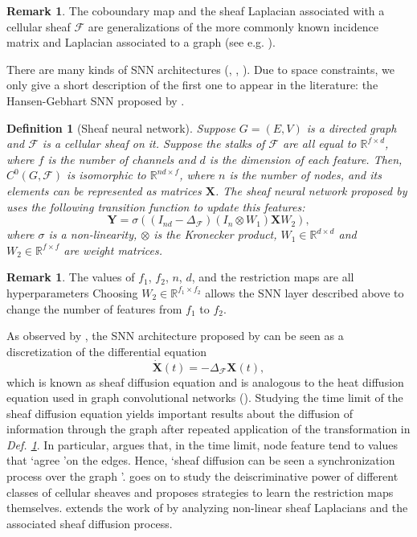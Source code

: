 \documentclass[11pt,a4paper,openright,twoside]{report}
\newcounter{mycounter}
\theoremstyle{plain}
\newtheorem{definition}[mycounter]{Definition}
\theoremstyle{definition}
\newtheorem{remark}[mycounter]{Remark}
\begin{document}
\begin{remark}
  The coboundary map and the sheaf Laplacian associated with a cellular sheaf $\mathcal{F}$ are generalizations of the more commonly known incidence matrix and Laplacian associated to a graph (see e.g. \cite{ward2022practical}).
\end{remark}

There are many kinds of SNN architectures (\cite{hansen2020sheaf}, \cite{bodnar2022neural}, \cite{zaghen2024nonlinear}). Due to space constraints, we only give a short description of the first one to appear in the literature: the Hansen-Gebhart SNN proposed by \cite{hansen2020sheaf}.

\begin{definition}[Sheaf neural network]
  \label{def: sheafnn}
  Suppose $G = (E,V)$ is a directed graph and $\mathcal{F}$ is a cellular sheaf on it. Suppose the stalks of $\mathcal{F}$ are all equal to $\mathbb{R}^{f \times d}$, where $f$ is the number of channels and $d$ is the dimension of each feature. Then, $C^0(G, \mathcal{F})$ is isomorphic to $\mathbb{R}^{nd \times f}$, where $n$ is the number of nodes, and its elements can be represented as matrices $\mathbf{X}$. The sheaf neural network proposed by \cite{hansen2020sheaf} uses the following transition function to update this features:
  \[\mathbf{Y} = \sigma((I_{nd} - \Delta_{\mathcal{F}})(I_{n} \otimes W_1)\mathbf{X}W_2),\]
  where $\sigma$ is a non-linearity, $\otimes$ is the Kronecker product, $W_1 \in \mathbb{R}^{d \times d}$ and $W_2 \in \mathbb{R}^{f \times f}$ are weight matrices.
\end{definition}

\begin{remark}
  The values of $f_1$, $f_2$, $n$, $d$, and the restriction maps are all hyperparameters
  Choosing $W_2 \in \mathbb{R}^{f_1 \times f_2}$ allows the SNN layer described above to change the number of features from $f_1$ to $f_2$.  
\end{remark}

As observed by \cite{bodnar2022neural}, the SNN architecture proposed by \cite{hansen2020sheaf} can be seen as a discretization of the differential equation 
\[\dot{\mathbf{X}}(t) = -\Delta_{\mathcal{F}}\mathbf{X}(t),\]
which is known as sheaf diffusion equation and is analogous to the heat diffusion equation used in graph convolutional networks (\cite{bodnar2022neural}). Studying the time limit of the sheaf diffusion equation yields important results about the diffusion of information through the graph after repeated application of the transformation in \textit{Def. \ref{def: sheafnn}}. In particular, \cite{bodnar2022neural} argues that, in the time limit, node feature tend to values that \lq agree \rq on the edges. Hence, \lq sheaf diffusion can be seen a synchronization process over the graph \rq. \cite{bodnar2022neural} goes on to study the deiscriminative power of different classes of cellular sheaves and proposes strategies to learn the restriction maps themselves. \cite{zaghen2024nonlinear} extends the work of \cite{bodnar2022neural} by analyzing non-linear sheaf Laplacians and the associated sheaf diffusion process.
\end{document}
